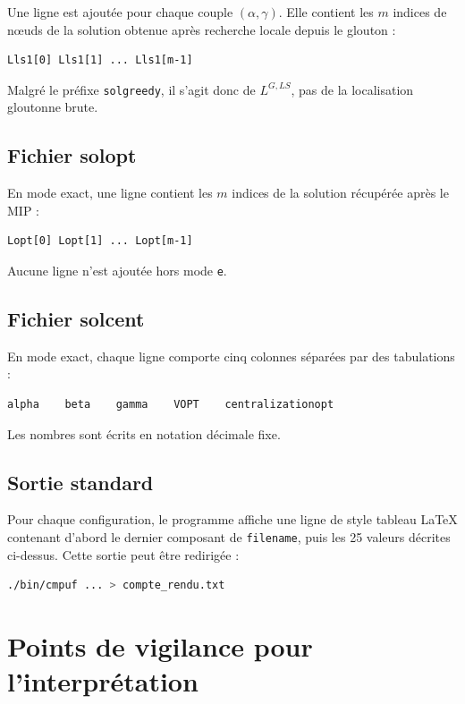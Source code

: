 \documentclass[11pt,a4paper]{article}
\newcommand{\code}[1]{\texttt{#1}}
\begin{document}
Une ligne est ajoutée pour chaque couple $(\alpha,\gamma)$. Elle contient les
$m$ indices de nœuds de la solution obtenue après recherche locale depuis le
glouton :
\begin{lstlisting}
Lls1[0] Lls1[1] ... Lls1[m-1]
\end{lstlisting}
Malgré le préfixe \code{solgreedy}, il s'agit donc de $L^{G,LS}$, pas de la
localisation gloutonne brute.

\subsection{Fichier solopt}

En mode exact, une ligne contient les $m$ indices de la solution récupérée
après le MIP :
\begin{lstlisting}
Lopt[0] Lopt[1] ... Lopt[m-1]
\end{lstlisting}
Aucune ligne n'est ajoutée hors mode \code{e}.

\subsection{Fichier solcent}

En mode exact, chaque ligne comporte cinq colonnes séparées par des
tabulations :
\begin{lstlisting}
alpha    beta    gamma    VOPT    centralizationopt
\end{lstlisting}
Les nombres sont écrits en notation décimale fixe.

\subsection{Sortie standard}

Pour chaque configuration, le programme affiche une ligne de style tableau
LaTeX contenant d'abord le dernier composant de \code{filename}, puis les 25
valeurs décrites ci-dessus. Cette sortie peut être redirigée :
\begin{lstlisting}[language=bash]
./bin/cmpuf ... > compte_rendu.txt
\end{lstlisting}

\section{Points de vigilance pour l'interprétation}
\end{document}
